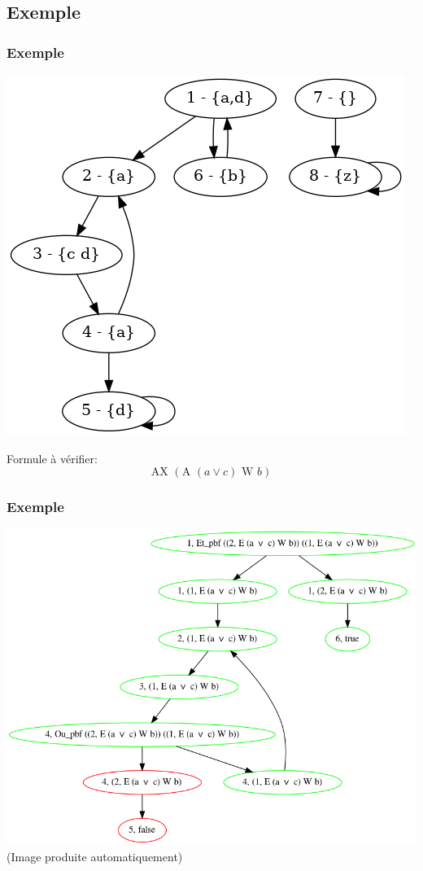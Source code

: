 \documentclass[11pt]{beamer}
\begin{document}
\subsection{Exemple}
\begin{frame}
	\frametitle{Exemple}
	\begin{center}
	\includegraphics[scale=0.35]{imgs/g2.png}
	\end{center}
Formule à vérifier:
	$$ \mbox{AX } (\mbox{A } (a \lor c) \mbox{ W } b) $$
\end{frame}

\begin{frame}
	\frametitle{Exemple}
	\begin{center}
    \includegraphics[scale=0.325]{imgs/g2-AXEa+cWb.png}\\
    (Image produite automatiquement)
	\end{center}
\end{frame}
\end{document}
